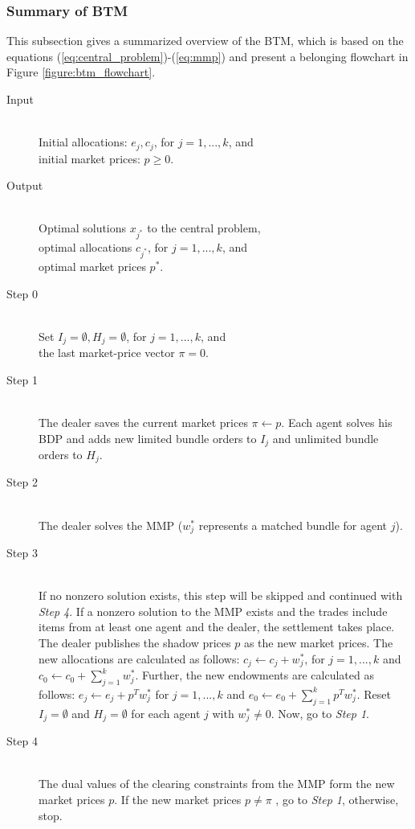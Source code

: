 \subsubsection{Summary of BTM}
\label{sec:summary_of_btm}
This subsection gives a summarized overview of the BTM, which 
is based on the equations (\ref{eq:central_problem})-(\ref{eq:mmp}) and 
present a belonging flowchart in Figure \ref{figure:btm_flowchart}.

\begin{description}
 \item[Input] \hfill \\
 Initial allocations: $e_{j}, c_{j}$, for $j=1,...,k$, and \\
 initial market prices: $p \geq 0$.
 \item[Output] \hfill \\
 Optimal solutions $x_{j^{*}}$ to the central problem, \\
 optimal allocations $c_{j^{*}}$, for $j=1,...,k$, and \\
 optimal market prices $p^{*}$.
 \item[Step 0] \hfill \\
 Set $I_{j} = \emptyset, H_{j} = \emptyset$, for $j=1,...,k$, and \\
 the last market-price vector $\pi = 0$.
 \item[Step 1] \hfill \\
 The dealer saves the current market prices $\pi \leftarrow p$. Each agent solves his 
 BDP and adds new limited bundle orders to $I_{j}$ and 
 unlimited bundle orders to $H_{j}$.
 \item[Step 2] \hfill \\
 The dealer solves the MMP ($w_{j}^{*}$ represents a matched bundle for agent $j$). 
 \item[Step 3] \hfill \\
 If no nonzero solution exists, this step will be skipped and continued with \textit{Step 4}.
 If a nonzero solution to the MMP exists and the trades include items from at least one agent and the dealer, the settlement takes place. 
 The dealer publishes the shadow prices $p$ as the new market prices.
 The new allocations are calculated as follows:
 $c_{j} \leftarrow c_{j} + w_{j}^{*}$, for $j=1,...,k$ and $c_{0} \leftarrow c_{0} + \sum\limits_{j=1}^{k} w_{j}^{*}$.
 Further, the new endowments are calculated as follows:
 $e_{j} \leftarrow e_{j} + p^{T} w_{j}^{*}$ for $j=1,...,k$ and $e_{0} \leftarrow e_{0} + \sum\limits_{j=1}^{k} p^{T} w_{j}^{*}$.
 Reset $I_{j} = \emptyset$ and $H_{j} = \emptyset$ for each agent $j$ with $w_{j}^{*} \neq 0$.
 Now, go to \textit{Step 1}. 
 \item[Step 4] \hfill \\
 The dual values of the clearing constraints from the MMP form the new market prices $p$. 
 If the new market prices $p \neq \pi$ , go to \textit{Step 1}, otherwise, stop.
\end{description}

